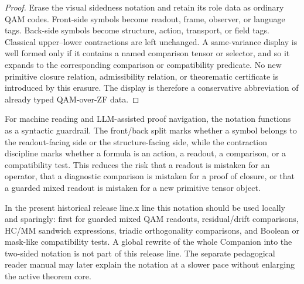 \begin{proof}
Erase the visual sidedness notation and retain its role data as ordinary QAM codes. Front-side symbols become readout, frame, observer, or language tags. Back-side symbols become structure, action, transport, or field tags. Classical upper--lower contractions are left unchanged. A same-variance display is well formed only if it contains a named comparison tensor or selector, and so it expands to the corresponding comparison or compatibility predicate. No new primitive closure relation, admissibility relation, or theorematic certificate is introduced by this erasure. The display is therefore a conservative abbreviation of already typed QAM-over-ZF data.
\end{proof}

\begin{remark}\label{rem:two-sided-llm-role-stability}
For machine reading and LLM-assisted proof navigation, the notation functions as a syntactic guardrail. The front/back split marks whether a symbol belongs to the readout-facing side or the structure-facing side, while the contraction discipline marks whether a formula is an action, a readout, a comparison, or a compatibility test. This reduces the risk that a readout is mistaken for an operator, that a diagnostic comparison is mistaken for a proof of closure, or that a guarded mixed readout is mistaken for a new primitive tensor object.
\end{remark}

\begin{remark}\label{rem:two-sided-present-release-use}
In the present historical release line.x line this notation should be used locally and sparingly: first for guarded mixed QAM readouts, residual/drift comparisons, HC/MM sandwich expressions, triadic orthogonality comparisons, and Boolean or mask-like compatibility tests. A global rewrite of the whole Companion into the two-sided notation is not part of this release line. The separate pedagogical reader manual may later explain the notation at a slower pace without enlarging the active theorem core.
\end{remark}


%

